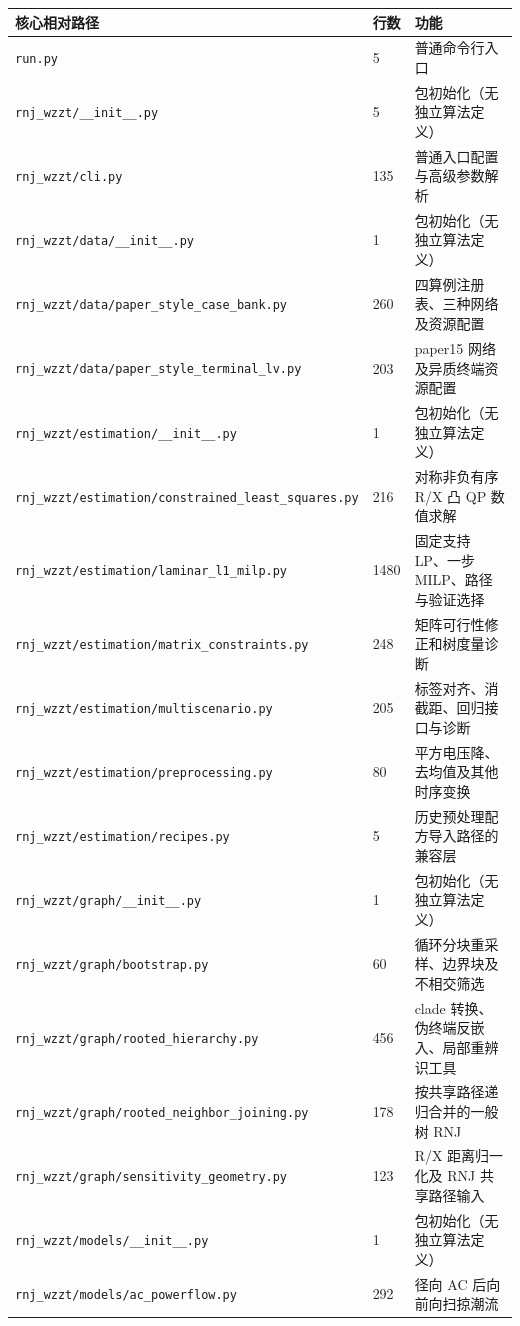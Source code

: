 \begin{longtable}{P{8.0cm}P{0.8cm}P{6.0cm}}
\toprule 核心相对路径 & 行数 & 功能\\\midrule\endhead
\nolinkurl{run.py} & 5 & 普通命令行入口 \\
\nolinkurl{rnj_wzzt/__init__.py} & 5 & 包初始化（无独立算法定义） \\
\nolinkurl{rnj_wzzt/cli.py} & 135 & 普通入口配置与高级参数解析 \\
\nolinkurl{rnj_wzzt/data/__init__.py} & 1 & 包初始化（无独立算法定义） \\
\nolinkurl{rnj_wzzt/data/paper_style_case_bank.py} & 260 & 四算例注册表、三种网络及资源配置 \\
\nolinkurl{rnj_wzzt/data/paper_style_terminal_lv.py} & 203 & paper15 网络及异质终端资源配置 \\
\nolinkurl{rnj_wzzt/estimation/__init__.py} & 1 & 包初始化（无独立算法定义） \\
\nolinkurl{rnj_wzzt/estimation/constrained_least_squares.py} & 216 & 对称非负有序 R/X 凸 QP 数值求解 \\
\nolinkurl{rnj_wzzt/estimation/laminar_l1_milp.py} & 1480 & 固定支持 LP、一步 MILP、路径与验证选择 \\
\nolinkurl{rnj_wzzt/estimation/matrix_constraints.py} & 248 & 矩阵可行性修正和树度量诊断 \\
\nolinkurl{rnj_wzzt/estimation/multiscenario.py} & 205 & 标签对齐、消截距、回归接口与诊断 \\
\nolinkurl{rnj_wzzt/estimation/preprocessing.py} & 80 & 平方电压降、去均值及其他时序变换 \\
\nolinkurl{rnj_wzzt/estimation/recipes.py} & 5 & 历史预处理配方导入路径的兼容层 \\
\nolinkurl{rnj_wzzt/graph/__init__.py} & 1 & 包初始化（无独立算法定义） \\
\nolinkurl{rnj_wzzt/graph/bootstrap.py} & 60 & 循环分块重采样、边界块及不相交筛选 \\
\nolinkurl{rnj_wzzt/graph/rooted_hierarchy.py} & 456 & clade 转换、伪终端反嵌入、局部重辨识工具 \\
\nolinkurl{rnj_wzzt/graph/rooted_neighbor_joining.py} & 178 & 按共享路径递归合并的一般树 RNJ \\
\nolinkurl{rnj_wzzt/graph/sensitivity_geometry.py} & 123 & R/X 距离归一化及 RNJ 共享路径输入 \\
\nolinkurl{rnj_wzzt/models/__init__.py} & 1 & 包初始化（无独立算法定义） \\
\nolinkurl{rnj_wzzt/models/ac_powerflow.py} & 292 & 径向 AC 后向前向扫掠潮流 \\

\end{longtable}

